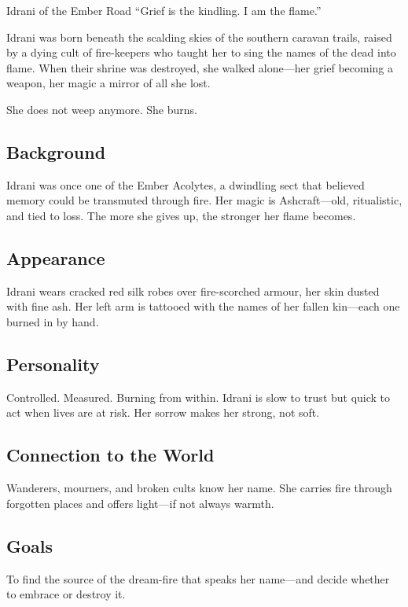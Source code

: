 \newpage
\begin{WyrdCharacterSheet}
    {Idrani of the Ember Road}
    {“Grief is the kindling. I am the flame.”}
    \label{pc:idrani-ember}

    Idrani was born beneath the scalding skies of the southern caravan trails, raised by a dying cult of fire-keepers who taught her to sing the names of the dead into flame. When their shrine was destroyed, she walked alone—her grief becoming a weapon, her magic a mirror of all she lost. 

    She does not weep anymore. She burns.

    \subsection{Background}
    Idrani was once one of the Ember Acolytes, a dwindling sect that believed memory could be transmuted through fire. Her magic is Ashcraft—old, ritualistic, and tied to loss. The more she gives up, the stronger her flame becomes.

    \subsection{Appearance}
    Idrani wears cracked red silk robes over fire-scorched armour, her skin dusted with fine ash. Her left arm is tattooed with the names of her fallen kin—each one burned in by hand.

    \subsection{Personality}
    Controlled. Measured. Burning from within. Idrani is slow to trust but quick to act when lives are at risk. Her sorrow makes her strong, not soft.

    \subsection{Connection to the World}
    Wanderers, mourners, and broken cults know her name. She carries fire through forgotten places and offers light—if not always warmth.

    \subsection{Goals}
    To find the source of the dream-fire that speaks her name—and decide whether to embrace or destroy it.


\end{WyrdCharacterSheet}
